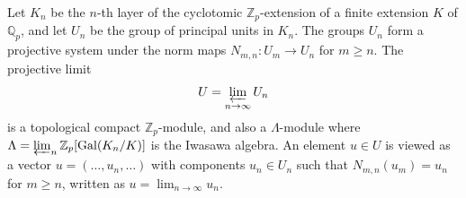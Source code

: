 Let $K_n$ be the $n$-th layer of the cyclotomic $\mathbb{Z}_p$-extension of a finite extension $K$ of $\mathbb{Q}_p$, and let $U_n$ be the group of principal units in $K_n$. The groups $U_n$ form a projective system under the norm maps $N_{m,n}: U_m \to U_n$ for $m \ge n$. The projective limit
$$U = \varprojlim_{n \to \infty} U_n$$
is a topological compact $\mathbb{Z}_p$-module, and also a $\Lambda$-module where $\Lambda = \varprojlim_n \mathbb{Z}_p[\mathrm{Gal}(K_n/K)]$ is the Iwasawa algebra. An element $u \in U$ is viewed as a vector $u = (\dots, u_n, \dots)$ with components $u_n \in U_n$ such that $N_{m,n}(u_m) = u_n$ for $m \ge n$, written as $u = \lim_{n \to \infty} u_n$.
